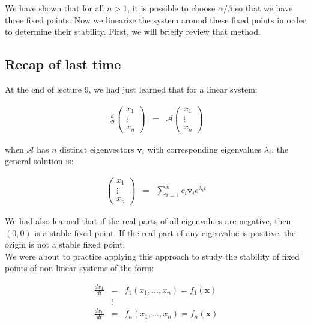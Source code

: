 \documentclass{article}
\begin{document}
We have shown that for all $n>1$, it is possible to choose $\alpha/\beta$ so that we have three fixed points. Now we linearize the system around these fixed points in order to determine their stability. First, we will briefly review that method.

\subsection*{Recap of last time}

 At the end of lecture 9, we had just learned that for a linear system:

\begin{eqnarray}
\frac{d}{dt} \begin{pmatrix} x_1 \\ \vdots \\ x_n \end{pmatrix} & = & \mathcal{A} \begin{pmatrix} x_1 \\ \vdots \\ x_n \end{pmatrix} \label{eqn:generallinearsystem}
\end{eqnarray}

when $\mathcal{A}$ has $n$ distinct eigenvectors $\mathbf{v}_i$ with corresponding eigenvalues $\lambda_i$, the general solution is:

\begin{eqnarray}
\begin{pmatrix} x_1 \\ \vdots \\ x_n \end{pmatrix} & = & \sum_{i=1}^n c_i \mathbf{v}_i e^{\lambda_i t} \label{eqn:generallinearsolution}
\end{eqnarray}

We had also learned that if the real parts of all eigenvalues are negative, then $(0,0)$ is a stable fixed point. If the real part of any eigenvalue is positive, the origin is not a stable fixed point. \\

We were about to practice applying this approach to study the stability of fixed points of non-linear systems of the form:

\begin{eqnarray*}
\frac{dx_1}{dt}& = & f_1(x_1, \ldots, x_n) = f_1(\mathbf{x})\\
& \vdots & \\
\frac{dx_n}{dt}& = & f_n(x_1, \ldots, x_n) = f_n(\mathbf{x})
\end{eqnarray*}
\end{document}
